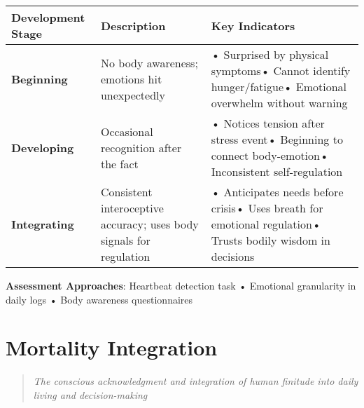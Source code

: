 \documentclass[
  a4paper,
]{report}
\begin{document}
\begin{longtable}[]{@{}
  >{\raggedright\arraybackslash}p{}
  >{\raggedright\arraybackslash}p{}
  >{\raggedright\arraybackslash}p{}@{}}
\toprule\noalign{}
\begin{minipage}[b]{\linewidth}\raggedright
Development Stage
\end{minipage} & \begin{minipage}[b]{\linewidth}\raggedright
Description
\end{minipage} & \begin{minipage}[b]{\linewidth}\raggedright
Key Indicators
\end{minipage} \\
\midrule\noalign{}
\endhead
\bottomrule\noalign{}
\endlastfoot
\textbf{Beginning} & No body awareness; emotions hit unexpectedly & •
Surprised by physical symptoms• Cannot identify hunger/fatigue•
Emotional overwhelm without warning \\
\textbf{Developing} & Occasional recognition after the fact & • Notices
tension after stress event• Beginning to connect body-emotion•
Inconsistent self-regulation \\
\textbf{Integrating} & Consistent interoceptive accuracy; uses body
signals for regulation & • Anticipates needs before crisis• Uses breath
for emotional regulation• Trusts bodily wisdom in decisions \\
\end{longtable}

\textbf{Assessment Approaches}: Heartbeat detection task • Emotional
granularity in daily logs • Body awareness questionnaires

\section{Mortality Integration}

\begin{quote}
\emph{The conscious acknowledgment and integration of human finitude
into daily living and decision-making}
\end{quote}
\end{document}
